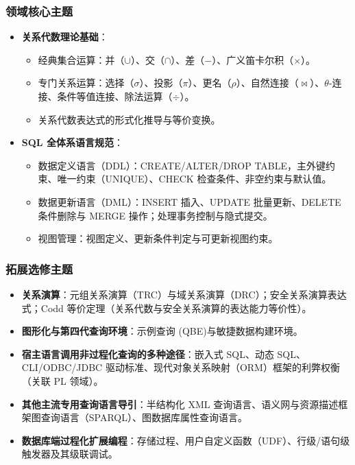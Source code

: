 \subsubsection{领域核心主题}
\begin{itemize}
    \item \textbf{关系代数理论基础}：
    \begin{itemize}
        \item 经典集合运算：并（$\cup$）、交（$\cap$）、差（$-$）、广义笛卡尔积（$\times$）。
        \item 专门关系运算：选择（$\sigma$）、投影（$\pi$）、更名（$\rho$）、自然连接（$\bowtie$）、$\theta$-连接、条件等值连接、除法运算（$\div$）。
        \item 关系代数表达式的形式化推导与等价变换。
    \end{itemize}
    \item \textbf{SQL 全体系语言规范}：
    \begin{itemize}
        \item 数据定义语言（DDL）：CREATE/ALTER/DROP TABLE，主外键约束、唯一约束（UNIQUE）、CHECK 检查条件、非空约束与默认值。
        \item 数据更新语言（DML）：INSERT 插入、UPDATE 批量更新、DELETE 条件删除与 MERGE 操作；处理事务控制与隐式提交。
        \item 视图管理：视图定义、更新条件判定与可更新视图约束。
    \end{itemize}
\end{itemize}

\subsubsection{拓展选修主题}
\begin{itemize}
    \item \textbf{关系演算}：元组关系演算（TRC）与域关系演算（DRC）；安全关系演算表达式；Codd 等价定理（关系代数与安全关系演算的表达能力等价性）。
    \item \textbf{图形化与第四代查询环境}：示例查询 (QBE)与敏捷数据构建环境。
    \item \textbf{宿主语言调用非过程化查询的多种途径}：嵌入式 SQL、动态 SQL、CLI/ODBC/JDBC 驱动标准、现代对象关系映射（ORM）框架的利弊权衡（关联 PL 领域）。
    \item \textbf{其他主流专用查询语言导引}：半结构化 XML 查询语言、语义网与资源描述框架图查询语言（SPARQL）、图数据库属性查询语言。
    \item \textbf{数据库端过程化扩展编程}：存储过程、用户自定义函数（UDF）、行级/语句级触发器及其级联调试。
\end{itemize}

